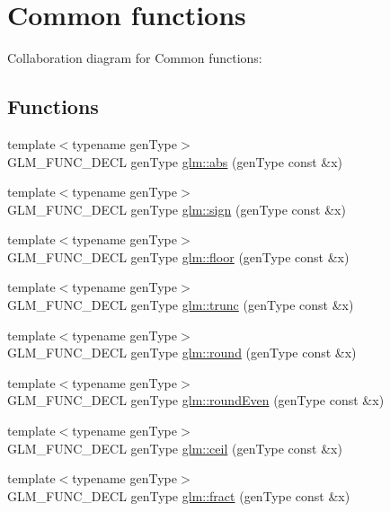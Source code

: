 \hypertarget{group__core__func__common}{
\section{Common functions}
\label{group__core__func__common}
}


Collaboration diagram for Common functions:\subsection*{Functions}
\begin{CompactItemize}
\item 
{\footnotesize template$<$typename genType$>$ }\\GLM\_\-FUNC\_\-DECL genType \hyperlink{group__core__func__common_gab4b95b47f2918ce6e7ac279a0ba27c1}{glm::abs} (genType const \&x)
\item 
{\footnotesize template$<$typename genType$>$ }\\GLM\_\-FUNC\_\-DECL genType \hyperlink{group__core__func__common_g74ce53889485c33ac9d81d2b27165c80}{glm::sign} (genType const \&x)
\item 
{\footnotesize template$<$typename genType$>$ }\\GLM\_\-FUNC\_\-DECL genType \hyperlink{group__core__func__common_gf87c2d5cbed8b293dcb7506b7c06c9e1}{glm::floor} (genType const \&x)
\item 
{\footnotesize template$<$typename genType$>$ }\\GLM\_\-FUNC\_\-DECL genType \hyperlink{group__core__func__common_g30f4c901cd3ebdd26e8f0a73f15c1e89}{glm::trunc} (genType const \&x)
\item 
{\footnotesize template$<$typename genType$>$ }\\GLM\_\-FUNC\_\-DECL genType \hyperlink{group__core__func__common_g931fae510be1b98fe22646fc649a50d2}{glm::round} (genType const \&x)
\item 
{\footnotesize template$<$typename genType$>$ }\\GLM\_\-FUNC\_\-DECL genType \hyperlink{group__core__func__common_ge07e5945cc0443ab91a28da0aa2ba864}{glm::roundEven} (genType const \&x)
\item 
{\footnotesize template$<$typename genType$>$ }\\GLM\_\-FUNC\_\-DECL genType \hyperlink{group__core__func__common_g18be34b68c7f647b4455bafe4c7d7ecd}{glm::ceil} (genType const \&x)
\item 
{\footnotesize template$<$typename genType$>$ }\\GLM\_\-FUNC\_\-DECL genType \hyperlink{group__core__func__common_g7418318e0c1a82f21805628aabb0e24e}{glm::fract} (genType const \&x)

\end{CompactItemize}
